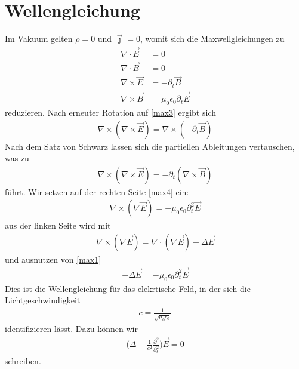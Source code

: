 \documentclass{scrartcl}
\begin{document}
 \section{Wellengleichung}
Im Vakuum gelten $\rho=0$ und $\vec{\jmath}=0$, womit sich die
Maxwellgleichungen zu
 \begin{align}
\nabla\cdot\vec{E} &= 0     \label{eqn:max1}\\
\nabla\cdot\vec{B} &= 0   \label{eqn:max2}  \\
\nabla\times\vec{E} &= -\partial_t\vec{B} \label{eqn:max3} \\
\nabla\times\vec{B} &= \mu_0\epsilon_0\partial_t{\vec{E}} \label{eqn:max4}
 \end{align}
 reduzieren. Nach erneuter Rotation auf \eqref{max3} ergibt sich
 \begin{align}
   \nabla\times(\nabla\times\vec{E}) = \nabla\times(-\partial_t\vec{B})
   \label{eqn:9}
 \end{align}
 Nach dem Satz von Schwarz lassen sich die partiellen Ableitungen
 vertauschen, was zu
 \begin{align}
   \nabla\times(\nabla\times\vec{E}) = -\partial_t(\nabla\times\vec{B})
   \label{eqn:10}
 \end{align}
 führt. Wir setzen auf der rechten Seite \eqref{max4} ein:
 \begin{align}
   \nabla\times(\nabla\vec{E})=-\mu_0\epsilon_0\partial_t^2\vec{E}
   \label{eqn:11}
 \end{align}
 aus der linken Seite wird mit
 \begin{align}
 \nabla\times(\nabla\vec{E})= \nabla\cdot(\nabla\vec{E})- \Delta\vec{E}
 \label{eqn:12}
 \end{align}
 und ausnutzen von \eqref{max1}
 \begin{align}
   -\Delta\vec{E}=-\mu_0\epsilon_0\partial_t^2\vec{E}
   \label{eqn:13}
 \end{align}
 Dies ist die Wellengleichung für das elekrtische Feld,
 in der sich die Lichtgeschwindigkeit
 \begin{align}
 c=\frac{1}{\sqrt{\mu_0\epsilon_0}} \label{eqn:14}
\end{align}
identifizieren lässt. Dazu können wir
\begin{align}
  \biggl(\Delta-\frac{1}{c^2}\frac{\partial^2}{\partial_t^2}\biggr)\vec{E}=0
\end{align}
\label{eqn:15}
schreiben.
\end{document}
